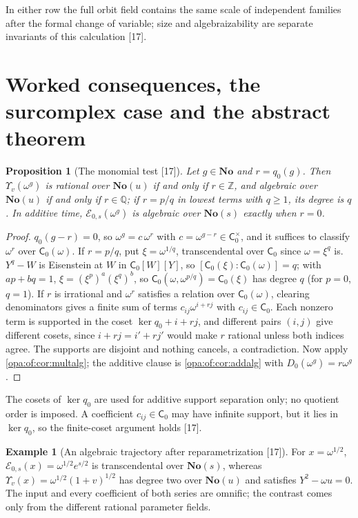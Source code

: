 \documentclass[11pt,oneside]{article}
\numberwithin{equation}{section}
\newtheorem{proposition}[proposition]{Proposition}
\theoremstyle{definition}
\newtheorem{example}[example]{Example}
\theoremstyle{remark}
\newcommand{\No}{\mathbf{No}}
\newcommand{\Q}{\mathbb Q}
\newcommand{\Z}{\mathbb Z}
\newcommand{\EE}{\mathcal E}
\newcommand{\src}[1]{\textup{\textsf{\small[#1]}}}
\begin{document}
In either row the full orbit field contains the same scale of independent families after the formal change of variable; size
and algebraizability are separate invariants of this calculation \src{17}.

\section{Worked consequences, the surcomplex case and the abstract theorem}\label{opa:of:sec:examples}

\begin{proposition}[The monomial test \src{17}]\label{opa:of:prop:monomialtest}
Let $g\in\No$ and $r=q_0(g)$. Then $\Upsilon_v(\omega^g)$ is rational over $\No(u)$ if and only if $r\in\Z$, and algebraic over
$\No(u)$ if and only if $r\in\Q$; if $r=p/q$ in lowest terms with $q\ge1$, its degree is $q$. In additive time,
$\EE_{0,s}(\omega^g)$ is algebraic over $\No(s)$ exactly when $r=0$.
\end{proposition}
\begin{proof}
$q_0(g-r)=0$, so $\omega^g=c\,\omega^r$ with $c=\omega^{g-r}\in\mathsf C_0^\times$, and it suffices to classify $\omega^r$ over
$\mathsf C_0(\omega)$. If $r=p/q$, put $\xi=\omega^{1/q}$, transcendental over $\mathsf C_0$ since $\omega=\xi^q$ is. $Y^q-W$ is
Eisenstein at $W$ in $\mathsf C_0[W][Y]$, so $[\mathsf C_0(\xi):\mathsf C_0(\omega)]=q$; with $ap+bq=1$, $\xi=(\xi^p)^a(\xi^q)^b$, so
$\mathsf C_0(\omega,\omega^{p/q})=\mathsf C_0(\xi)$ has degree $q$ (for $p=0$, $q=1$). If $r$ is irrational and $\omega^r$ satisfies a
relation over $\mathsf C_0(\omega)$, clearing denominators gives a finite sum of terms $c_{ij}\omega^{i+rj}$ with $c_{ij}\in\mathsf C_0$.
Each nonzero term is supported in the coset $\ker q_0+i+rj$, and different pairs $(i,j)$ give different cosets, since
$i+rj=i'+rj'$ would make $r$ rational unless both indices agree. The supports are disjoint and nothing cancels, a
contradiction. Now apply \cref{opa:of:cor:multalg}; the additive clause is \cref{opa:of:cor:addalg} with
$D_0(\omega^g)=r\omega^g$.
\end{proof}

The cosets of $\ker q_0$ are used for additive support separation only; no quotient order is imposed. A coefficient
$c_{ij}\in\mathsf C_0$ may have infinite support, but it lies in $\ker q_0$, so the finite-coset argument holds \src{17}.

\begin{example}[An algebraic trajectory after reparametrization \src{17}]\label{opa:of:ex:sqrt}
For $x=\omega^{1/2}$, $\EE_{0,s}(x)=\omega^{1/2}e^{s/2}$ is transcendental over $\No(s)$, whereas
$\Upsilon_v(x)=\omega^{1/2}(1+v)^{1/2}$ has degree two over $\No(u)$ and satisfies $Y^2-\omega u=0$. The input and every coefficient
of both series are omnific; the contrast comes only from the different rational parameter fields.
\end{example}
\end{document}
